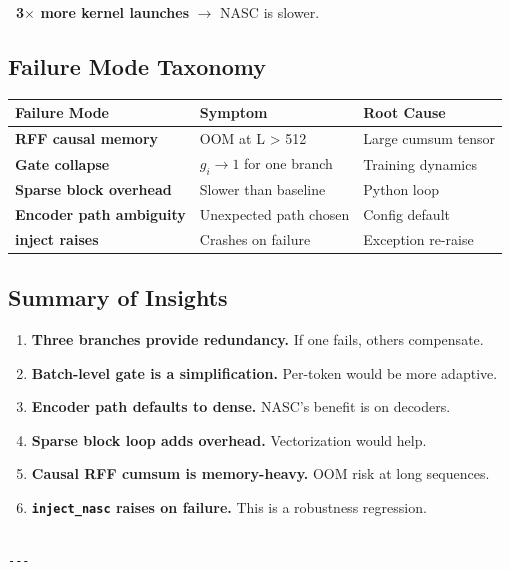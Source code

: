 \textbf{~3$\times$ more kernel launches} $\to$ NASC is slower.

\subsection{Failure Mode Taxonomy}

\begin{table}[H]
\centering
\small
\begin{tabular}{lll}
\toprule
\textbf{Failure Mode} & \textbf{Symptom} & \textbf{Root Cause} \\
\midrule
\textbf{RFF causal memory} & OOM at L \textgreater{} 512 & Large cumsum tensor \\
\textbf{Gate collapse} & $g_i \to 1$ for one branch & Training dynamics \\
\textbf{Sparse block overhead} & Slower than baseline & Python loop \\
\textbf{Encoder path ambiguity} & Unexpected path chosen & Config default \\
\textbf{inject raises} & Crashes on failure & Exception re-raise \\
\bottomrule
\end{tabular}
\end{table}

\subsection{Summary of Insights}

\begin{enumerate}
\item \textbf{Three branches provide redundancy.} If one fails, others compensate.
\item \textbf{Batch-level gate is a simplification.} Per-token would be more
  adaptive.
\item \textbf{Encoder path defaults to dense.} NASC's benefit is on decoders.
\item \textbf{Sparse block loop adds overhead.} Vectorization would help.
\item \textbf{Causal RFF cumsum is memory-heavy.} OOM risk at long sequences.
\item \textbf{\texttt{inject\_nasc} raises on failure.} This is a robustness regression.
\end{enumerate}
\begin{lstlisting}

---
\end{lstlisting}